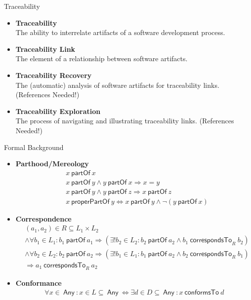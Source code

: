 \documentclass{beamer}
\newcommand{\partOf}{~\textsf{partOf}~}
\newcommand{\properPartOf}{~\textsf{properPartOf}~}
\newcommand{\Any}{~\textsf{Any}~}
\newcommand{\correspondsToR}[1]{~\textsf{correspondsTo}_{#1}~}
\newcommand{\conformsTo}{~\textsf{conformsTo}~}
\begin{document}
\begin{frame}{Traceability}
\begin{itemize}

\item
\textbf{Traceability}
\\The ability to interrelate artifacts of a software development process.\cite{Winkler:2010:STR:1861285.1861287}\cite{IEEEGlossary}

\item
\textbf{Traceability Link}
\\The element of a relationship between software artifacts.\cite{Winkler:2010:STR:1861285.1861287}

\item
\textbf{Traceability Recovery}
\\The (automatic) analysis of software artifacts for traceability links.
(References Needed!)

\item
\textbf{Traceability Exploration}
\\The process of navigating and illustrating traceability links.
(References Needed!)

\end{itemize}
\end{frame}

\begin{frame}{Formal Background}
\begin{itemize}
\item
\textbf{Parthood/Mereology}\cite{DBLP:conf/sle/Lammel16}\cite{DBLP:journals/dke/Varzi96}
{\scriptsize
\begin{align*}
&x \partOf x
\\&x \partOf y \wedge y \partOf x \Rightarrow x = y
\\&x \partOf y \wedge y \partOf z \Rightarrow x \partOf z
\\&x \properPartOf y \Leftrightarrow x \partOf y \wedge \neg(y \partOf x)
\end{align*}
}
\item
\textbf{Correspondence}\cite{DBLP:conf/sle/Lammel16}
{\scriptsize
\begin{align*}
&(a_1,a_2) \in R \subseteq L_1 \times L_2
\\&\wedge \forall b_1 \in L_1 : b_1 \partOf a_1 \Rightarrow (\exists! b_2 \in L_2 : b_2 \partOf a_2 \wedge b_1 \correspondsToR{R} b_2 )
\\&\wedge \forall b_2 \in L_2 : b_2 \partOf a_2 \Rightarrow (\exists! b_1 \in L_1 : b_1 \partOf a_2 \wedge b_2 \correspondsToR{R} b_1 )
\\&\Rightarrow a_1 \correspondsToR{R} a_2
\end{align*}
}
\item
\textbf{Conformance}\cite{DBLP:conf/sle/Lammel16}
{\scriptsize
\begin{align*}
\forall x \in \Any :
x \in L \subseteq \Any \Leftrightarrow \exists d \in D \subseteq \Any : x \conformsTo d
\end{align*}
}

\end{itemize}
\end{frame}
\end{document}
